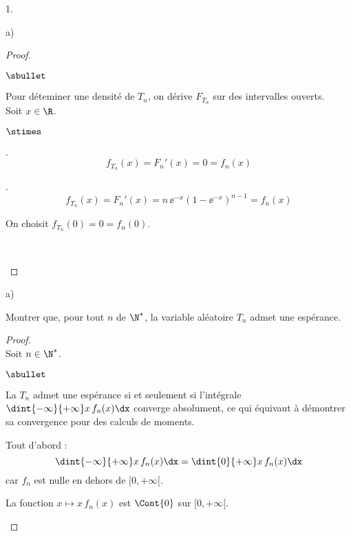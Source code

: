 \documentclass[11pt]{article}%
\begin{document}
\begin{noliste}{1.}
\begin{noliste}{a)}
\begin{proof}
\begin{noliste}{$\sbullet$}
    
    \newpage
    
    
  \item Pour déteminer une densité de $T_n$, on dérive $F_{T_n}$ sur
    des intervalles ouverts.\\
    Soit $x \in \R$.
    \begin{noliste}{$\stimes$}
      \item \dashuline{Si $x\in \ ]-\infty,0[$}.
      \[
       f_{T_n}(x) = F_n'(x)=0=f_n(x)
      \]
      
    \item \dashuline{Si $x\in \ ]0,+\infty[$}.
      \[
       f_{T_n}(x)= F_n'(x) = n \, \ee^{-x} (1-\ee^{-x})^{n-1}
       =f_n(x)
      \]
      
      \item On choisit $f_{T_n}(0)=0=f_n(0)$.
      \end{noliste}
      ~\\[-1.6cm]
   \end{noliste}
 \end{proof}
\end{noliste}
 
\item
  \begin{noliste}{a)}
    \setlength{\itemsep}{2mm}
  \item Montrer que, pour tout $n$ de $\N^*$, la variable aléatoire
    $T_n$ admet une espérance.
    
    \begin{proof}~\\
      Soit $n\in\N^*$.
      \begin{noliste}{$\sbullet$}
      \item La \var $T_n$ admet une espérance si et seulement si 
        l'intégrale $\dint{-\infty}{+\infty} x \, f_n(x) \dx$ converge 
        absolument, ce qui équivaut à démontrer sa convergence pour des 
        calculs de moments.
        
      \item Tout d'abord : 
        \[
        \dint{-\infty}{+\infty} x \, f_n(x) \dx = \dint{0}{+\infty} x
        \, f_n(x) \dx
        \]
        car $f_n$ est nulle en dehors de $[0, +\infty[$.
    
      \item La fonction $x \mapsto x \, f_n(x)$ est $\Cont{0}$ sur
        $[0,+\infty[$.
    

\end{noliste}
\end{proof}
\end{noliste}
\end{noliste}
\end{document}
